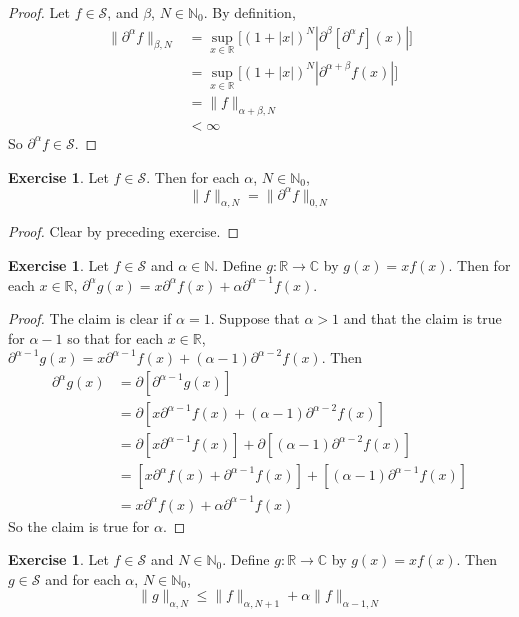 \documentclass[12pt]{amsart}
\theoremstyle{definition}
\newtheorem{ex}[definition]{Exercise}
\newcommand{\p}{\partial}
\newcommand{\al}{\alpha}
\newcommand{\bet}{\beta}
\newcommand{\C}{\mathbb{C}}
\newcommand{\N}{\mathbb{N}}
\newcommand{\R}{\mathbb{R}}
\newcommand{\MS}{\mathcal{S}}
\begin{document}
	\begin{proof}
		Let $f \in \MS$, and $\bet$, $N \in \N_0$. By definition, 
		\begin{align*}
			\|\p^{\al} f \|_{\bet, N}
			& = \sup_{x \in \R} \bigg[ (1 + |x|)^N |\p^{\beta} [\p^{\al} f] (x)| \bigg] \\
			&= \sup_{x \in \R} \bigg[ (1 + |x|)^N |\p^{\al + \beta}f (x)| \bigg] \\
			& = \|f \|_{\al + \bet, N} \\
			& < \infty
		\end{align*}
		So $\p^{\al}f \in \MS$.
	\end{proof}

	\begin{ex}
		Let $f \in \MS$. Then for each $\al$, $N \in \N_0$, 
		$$\|f\|_{\al, N} = \|\p^{\al} f\|_{0, N}$$
	\end{ex}

	\begin{proof}
		Clear by preceding exercise.
	\end{proof}

	\begin{ex}
		Let $f \in \MS$ and $\al \in \N$. Define $g: \R \rightarrow \C$ by $g(x) = xf(x)$. Then for each $x \in \R$, $\p^{\al}g(x) = x\p^{\al}f(x) + \al \p^{\al -1} f(x)$.
	\end{ex}
	
	\begin{proof}
		The claim is clear if $\al = 1$. Suppose that $\al > 1$ and that the claim is true for $\al - 1$ so that for each $x \in \R$,  $\p^{\al-1}g(x) = x\p^{\al-1}f(x) + (\al - 1) \p^{\al-2} f(x)$. Then 
		\begin{align*}
			\p^{\al}g(x)
			&= \p [\p^{\al-1}g(x)] \\
			&= \p [x\p^{\al-1}f(x) + (\al - 1) \p^{\al-2} f(x)] \\
			&= \p [x\p^{\al-1}f(x)] + \p[(\al - 1) \p^{\al-2} f(x)] \\
			&= [x \p^{\al}f(x) + \p^{\al-1}f(x)]  + [(\al -1) \p^{\al-1}f(x)] \\
			&= x \p^{\al}f(x) + \al \p^{\al-1}f(x)
		\end{align*}
		So the claim is true for $\al$.
	\end{proof}
	
	\begin{ex}
		Let $f \in \MS$ and $N \in \N_0$. Define $g: \R \rightarrow \C$ by $g(x) = xf(x)$. Then $g \in \MS$ and for each $\al$, $N \in \N_0$, 
		$$ \|g\|_{\al, N} \leq \|f\|_{\al, N+1} + \al \|f\|_{\al-1, N} $$ 
	\end{ex}
	
\end{document}
